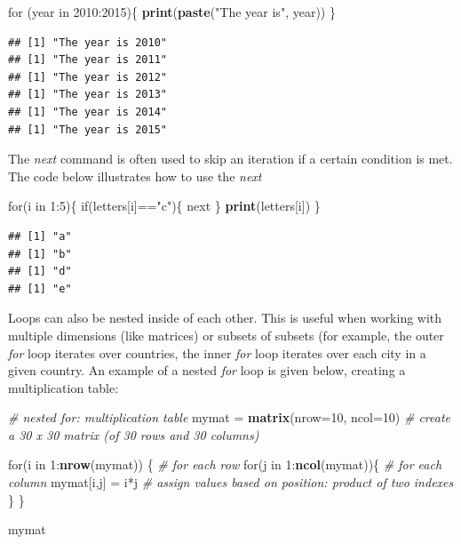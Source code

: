 \documentclass[]{book}
\newenvironment{Shaded}{\begin{snugshade}}{\end{snugshade}}
\newcommand{\KeywordTok}[1]{\textcolor[rgb]{0.13,0.29,0.53}{\textbf{{#1}}}}
\newcommand{\DataTypeTok}[1]{\textcolor[rgb]{0.13,0.29,0.53}{{#1}}}
\newcommand{\DecValTok}[1]{\textcolor[rgb]{0.00,0.00,0.81}{{#1}}}
\newcommand{\StringTok}[1]{\textcolor[rgb]{0.31,0.60,0.02}{{#1}}}
\newcommand{\CommentTok}[1]{\textcolor[rgb]{0.56,0.35,0.01}{\textit{{#1}}}}
\newcommand{\NormalTok}[1]{{#1}}
\begin{document}
\begin{Shaded}
\begin{Highlighting}[]
\NormalTok{for (year in }\DecValTok{2010}\NormalTok{:}\DecValTok{2015}\NormalTok{)\{}
  \KeywordTok{print}\NormalTok{(}\KeywordTok{paste}\NormalTok{(}\StringTok{"The year is"}\NormalTok{, year))}
\NormalTok{\}}
\end{Highlighting}
\end{Shaded}

\begin{verbatim}
## [1] "The year is 2010"
## [1] "The year is 2011"
## [1] "The year is 2012"
## [1] "The year is 2013"
## [1] "The year is 2014"
## [1] "The year is 2015"
\end{verbatim}

The \emph{next} command is often used to skip an iteration if a certain
condition is met. The code below illustrates how to use the \emph{next}

\begin{Shaded}
\begin{Highlighting}[]
\NormalTok{for(i in }\DecValTok{1}\NormalTok{:}\DecValTok{5}\NormalTok{)\{}
  \NormalTok{if(letters[i]==}\StringTok{"c"}\NormalTok{)\{}
    \NormalTok{next}
  \NormalTok{\}}
  \KeywordTok{print}\NormalTok{(letters[i])}
\NormalTok{\}}
\end{Highlighting}
\end{Shaded}

\begin{verbatim}
## [1] "a"
## [1] "b"
## [1] "d"
## [1] "e"
\end{verbatim}

Loops can also be nested inside of each other. This is useful when
working with multiple dimensions (like matrices) or subsets of subsets
(for example, the outer \emph{for} loop iterates over countries, the
inner \emph{for} loop iterates over each city in a given country. An
example of a nested \emph{for} loop is given below, creating a
multiplication table:

\begin{Shaded}
\begin{Highlighting}[]
\CommentTok{# nested for: multiplication table}
\NormalTok{mymat =}\StringTok{ }\KeywordTok{matrix}\NormalTok{(}\DataTypeTok{nrow=}\DecValTok{10}\NormalTok{, }\DataTypeTok{ncol=}\DecValTok{10}\NormalTok{) }\CommentTok{# create a 30 x 30 matrix (of 30 rows and 30 columns)}

\NormalTok{for(i in }\DecValTok{1}\NormalTok{:}\KeywordTok{nrow}\NormalTok{(mymat)) \{  }\CommentTok{# for each row}
  \NormalTok{for(j in }\DecValTok{1}\NormalTok{:}\KeywordTok{ncol}\NormalTok{(mymat))\{ }\CommentTok{# for each column}
    \NormalTok{mymat[i,j] =}\StringTok{ }\NormalTok{i*j     }\CommentTok{# assign values based on position: product of two indexes}
  \NormalTok{\}}
\NormalTok{\}}

\NormalTok{mymat}
\end{Highlighting}
\end{Shaded}
\end{document}
